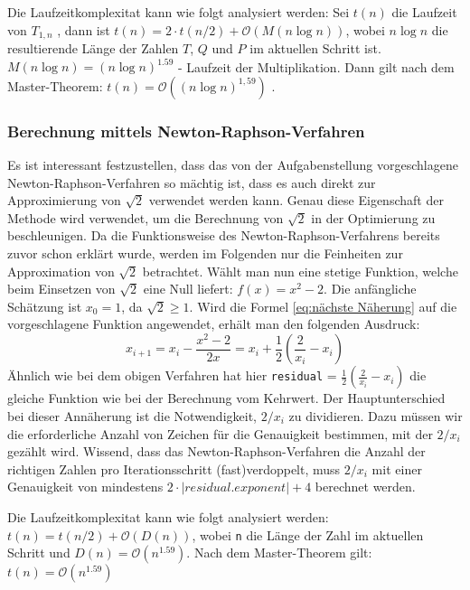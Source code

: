 \documentclass[course=erap]{aspdoc}
\begin{document}
Die Laufzeitkomplexitat kann wie folgt analysiert werden: Sei $t(n)$ die Laufzeit von $T_{1, n}$ , dann ist $t(n) = 2 \cdot t(n/2) + \mathcal{O}(M(n\log{n}))$, wobei $n\log{n}$  die resultierende Länge der Zahlen $T$, $Q$ und $P$ im aktuellen Schritt ist. $M(n\log{n}) = (n\log{n}) ^ {1.59}$ - Laufzeit der Multiplikation. Dann gilt nach dem Master-Theorem: $t(n) = \mathcal{O}((n\log{n}) ^ {1,59})$ .

\subsubsection{Berechnung mittels Newton-Raphson-Verfahren} 
Es ist interessant festzustellen, dass das von der Aufgabenstellung vorgeschlagene Newton-Raphson-Verfahren so mächtig ist, dass es  auch direkt zur Approximierung von $\sqrt{2}$ verwendet werden kann. Genau diese Eigenschaft der Methode wird verwendet, um die Berechnung von $\sqrt{2}$ in der Optimierung zu beschleunigen. Da die Funktionsweise des Newton-Raphson-Verfahrens bereits zuvor schon erklärt wurde, werden im Folgenden nur die Feinheiten zur Approximation von $\sqrt{2}$ betrachtet. Wählt man nun eine stetige Funktion, welche beim Einsetzen von $\sqrt{2}$ eine Null liefert: $f(x) = x^{2} - 2$. Die anfängliche Schätzung ist  $x_{0} = 1$, da $\sqrt{2} \ge 1$. Wird die Formel \ref{eq:nächste Näherung} auf die vorgeschlagene Funktion angewendet, erhält man den folgenden Ausdruck: \begin{equation} x_{i+1} = x_{i} - \frac{x^{2} - 2}{2x} = x_{i} + \frac{1}{2} \left(\frac{2}{x_{i}} - x_{i}\right)  \end{equation}
Ähnlich wie bei dem obigen Verfahren hat hier \texttt{residual} = $\frac{1}{2} \left(\frac{2}{x_{i}} - x_{i}\right)$ die gleiche Funktion wie bei der Berechnung vom Kehrwert. Der Hauptunterschied bei dieser Annäherung ist die Notwendigkeit, $2/x_{i}$ zu dividieren. Dazu müssen wir die erforderliche Anzahl von Zeichen für die Genauigkeit bestimmen, mit der $2/x_{i}$ gezählt wird. Wissend, dass das Newton-Raphson-Verfahren die Anzahl der richtigen Zahlen pro Iterationsschritt (fast)verdoppelt, muss $2/x_{i}$ mit einer Genauigkeit von mindestens $2 \cdot|residual.exponent| + 4$ berechnet werden.

Die Laufzeitkomplexitat kann wie folgt analysiert werden: $ t(n) = t(n/2) + \mathcal{O}(D(n))$, wobei \texttt{n} die Länge der Zahl im aktuellen Schritt und $D(n) = \mathcal{O}(n^{1.59})$. Nach dem Master-Theorem gilt: $t(n) = \mathcal{O}(n^{1.59})$
\end{document}
